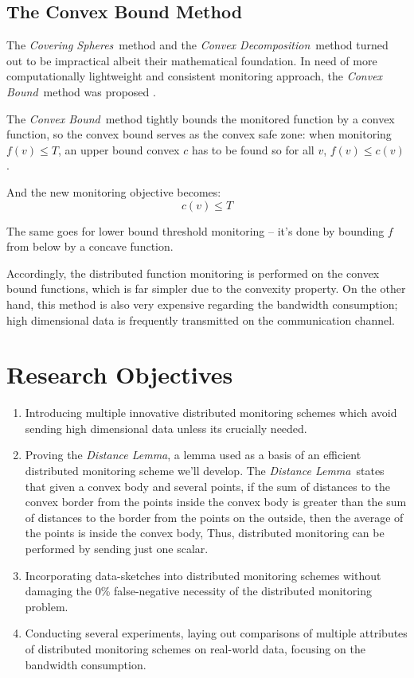 \documentclass[11pt, conference]{article}
\newcommand{\distanceLemma}{\textit{Distance Lemma}}
\newcommand{\coveringSpheres}{\textit{Covering Spheres}}
\newcommand{\convexDecomposition}{\textit{Convex Decomposition}}
\newcommand{\convexBound}{\textit{Convex Bound}}
\begin{document}
\subsection{The Convex Bound Method}

The \coveringSpheres \ method and the \convexDecomposition \ method turned out to be impractical albeit their mathematical foundation. In need of more computationally lightweight and consistent monitoring approach, the \convexBound \ method was proposed \cite{lazerson2018lightweight}.

The \convexBound \ method tightly bounds the monitored function by a convex function, so the convex bound serves as the convex safe zone: when monitoring $f(v) \leq T$, an upper bound convex $c$ has to be found so for all $v$, $f(v) \leq  c(v)$.

And the new monitoring objective becomes:
\begin{equation}
\label{monitoringConstraint}
c(v) \leq T
\end{equation}

The same goes for lower bound threshold monitoring -- it's done by bounding $f$ from below by a concave function.

Accordingly, the distributed function monitoring is performed on the convex bound functions, which is far simpler due to the convexity property. On the other hand, this method is also very expensive regarding the bandwidth consumption; high dimensional data is frequently transmitted on the communication channel.

\section{Research Objectives}

\begin{enumerate}
\item Introducing multiple innovative distributed monitoring schemes which avoid sending high dimensional data unless its crucially needed.

\item Proving the \distanceLemma , a lemma used as a basis of an efficient distributed monitoring scheme we'll develop. The \distanceLemma \ states that given a convex body and several points, if the sum of distances to the convex border from the points inside the convex body is greater than the sum of distances to the border from the points on the outside, then the average of the points is inside the convex body, Thus, distributed monitoring can be performed by sending just one scalar.

\item Incorporating data-sketches into distributed monitoring schemes without damaging the 0\% false-negative necessity of the distributed monitoring problem.

\item Conducting several experiments, laying out comparisons of multiple attributes of distributed monitoring schemes on real-world data, focusing on the bandwidth consumption.
\end{enumerate}



	
\end{document}
